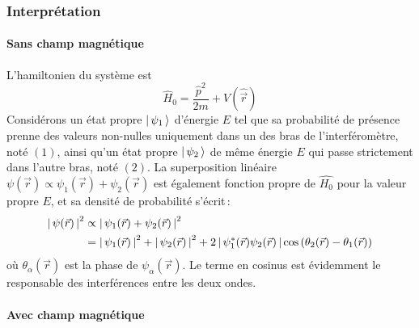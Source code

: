         \subsubsection{Interprétation}

            \paragraph{Sans champ magnétique} 
        
        L’hamiltonien du système est 
        \[ \hat{H}_0 = \frac{\hat{p}^2}{2m} + V(\hat{\vec{r}}) \]   
        Considérons un état propre $\left| \, \psi_1 \, \right> $ d’énergie $E$ tel que sa probabilité de présence prenne des valeurs non-nulles uniquement dans un des bras de l’interféromètre, noté $(1)$, ainsi qu’un état propre $\left| \, \psi_2 \, \right>$ de même énergie $E$ qui passe strictement dans l’autre bras, noté $(2)$. La superposition linéaire $\psi(\vec{r}) \propto \psi_1(\vec{r}) + \psi_2(\vec{r})$ est également fonction propre de $\hat{H_0}$ pour la valeur propre $E$, et sa densité de probabilité s’écrit :
        \begin{align*}
            \left\lvert \, \psi(\vec{r}) \, \right\rvert^2 
            &\propto \left\lvert \, \psi_1(\vec{r}) + \psi_2(\vec{r}) \, \right\rvert^2 \\
            &= \left\lvert \, \psi_1(\vec{r}) \, \right\rvert^2 + \left\lvert \, \psi_2(\vec{r}) \, \right\rvert^2 + 2 \left\lvert \, \psi_1^*(\vec{r}) \psi_2(\vec{r}) \, \right\rvert \cos\left(\theta_2(\vec{r}) - \theta_1(\vec{r})\right)
        \end{align*} 
        où $\theta_{\alpha}(\vec{r})$ est la phase de $\psi_{\alpha}(\vec{r})$. Le terme en cosinus est évidemment le responsable des interférences entre les deux ondes.

            \paragraph{Avec champ magnétique}

